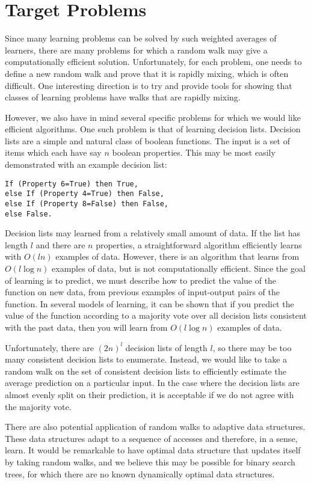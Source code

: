 \section{Target Problems}
Since many learning problems can be solved by such weighted averages of
learners, there are many problems for which a random walk may give a
computationally efficient solution.  Unfortunately, for each problem, one
needs to define a new random walk and prove that it is rapidly mixing, which
is often difficult.  One interesting direction is to try and provide tools for
showing that classes of learning problems have walks that are rapidly mixing. 

However, we also have in mind several specific problems for which we would
like efficient algorithms.  One such problem is that of learning decision
lists.  Decision lists are a simple and natural class of boolean functions.
The input is a set of items which each have say $n$ boolean properties.  This
may be most easily demonstrated with an example decision list:
\begin{verbatim}
If (Property 6=True) then True,
else If (Property 4=True) then False,
else If (Property 8=False) then False,
else False.
\end{verbatim}
		
Decision lists may learned from a relatively small amount of data.  If the
list has length $l$ and there are $n$ properties, a straightforward algorithm
efficiently learns with $O(ln)$ examples of data.  However, there is an
algorithm that learns from $O(l \log n)$ examples of data, but is not
computationally efficient.  Since the goal of learning is to predict, we must
describe how to predict the value of the function on new data, from previous
examples of input-output pairs of the function.  In several models of
learning, it can be shown that if you predict the value of the function
according to a majority vote over all decision lists consistent with the past
data, then you will learn from $O(l \log n)$ examples of data. 

Unfortunately, there are $(2n)^l$ decision lists of length $l$, so there may
be too many consistent decision lists to enumerate.  Instead, we would like
to take a random walk on the set of consistent decision lists to efficiently
estimate the average prediction on a particular input.  In the case where the
decision lists are almost evenly split on their prediction, it is acceptable
if we do not agree with the majority vote.

There are also potential application of random walks to adaptive data
structures.  These data structures adapt to a sequence of accesses and
therefore, in a sense, learn.  It would be remarkable to have optimal data
structure that updates itself by taking random walks, and we believe this may
be possible for binary search trees, for which there are no known dynamically
optimal data structures.


